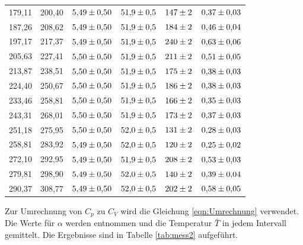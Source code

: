 \begin{table}
\begin{tabular}{c c c c c c}
        179,11 & 200,40 & $\num{5.49+-0.5}$ & $\num{51.9+-0.5}$ & $\num{147+-2}$ & $\num{0.37+-0.03}$\\
        187,26 & 208,62 & $\num{5.49+-0.5}$ & $\num{51.9+-0.5}$ & $\num{184+-2}$ & $\num{0.46+-0.04}$\\
        197,17 & 217,37 & $\num{5.49+-0.5}$ & $\num{51.9+-0.5}$ & $\num{240+-2}$ & $\num{0.63+-0.06}$\\
        205,63 & 227,41 & $\num{5.50+-0.5}$ & $\num{51.9+-0.5}$ & $\num{211+-2}$ & $\num{0.51+-0.05}$\\
        213,87 & 238,51 & $\num{5.50+-0.5}$ & $\num{51.9+-0.5}$ & $\num{175+-2}$ & $\num{0.38+-0.03}$\\
        224,40 & 250,67 & $\num{5.50+-0.5}$ & $\num{51.9+-0.5}$ & $\num{186+-2}$ & $\num{0.38+-0.03}$\\
        233,46 & 258,81 & $\num{5.50+-0.5}$ & $\num{51.9+-0.5}$ & $\num{166+-2}$ & $\num{0.35+-0.03}$\\
        243,31 & 268,01 & $\num{5.50+-0.5}$ & $\num{51.9+-0.5}$ & $\num{173+-2}$ & $\num{0.37+-0.03}$\\
        251,18 & 275,95 & $\num{5.50+-0.5}$ & $\num{52.0+-0.5}$ & $\num{131+-2}$ & $\num{0.28+-0.03}$\\
        258,81 & 283,92 & $\num{5.49+-0.5}$ & $\num{52.0+-0.5}$ & $\num{120+-2}$ & $\num{0.25+-0.02}$\\
        272,10 & 292,95 & $\num{5.49+-0.5}$ & $\num{51.9+-0.5}$ & $\num{208+-2}$ & $\num{0.53+-0.03}$\\
        279,81 & 298,90 & $\num{5.49+-0.5}$ & $\num{52.0+-0.5}$ & $\num{140+-2}$ & $\num{0.39+-0.04}$\\
        290,37 & 308,77 & $\num{5.49+-0.5}$ & $\num{52.0+-0.5}$ & $\num{202+-2}$ & $\num{0.58+-0.05}$\\
    \bottomrule
    \end{tabular}
\end{table}

Zur Umrechnung von $C_p$ zu $C_V$ wird die Gleichung \eqref{eqn:Umrechnung} verwendet. Die Werte für $\alpha$ werden \cite{Anleitung} entnommen und die 
Temperatur $\bar{T}$ in jedem Intervall gemittelt. Die Ergebnisse sind in Tabelle \ref{tab:mess2} aufgeführt.

